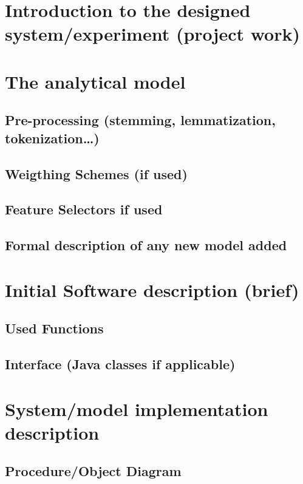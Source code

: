 \documentclass[a4paper,12pt,oneside]{article}
\begin{document}
\section {Introduction to the designed system/experiment (project work)}

\section {The analytical model}

\subsection{Pre-processing (stemming, lemmatization, tokenization…)}

\subsection{Weigthing Schemes (if used)}

\subsection{Feature Selectors if used}
    
\subsection{ Formal description of any new model added}   
        
\section{Initial Software description (brief)}

\subsection{Used Functions}

\subsection{Interface (Java classes if applicable)}

\section{System/model implementation description}
        
\subsection{Procedure/Object Diagram}
    
\end{document}
